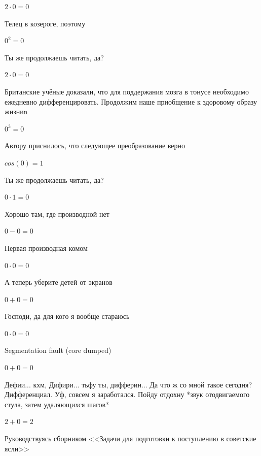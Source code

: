 \documentclass[12pt,a4paper,fleqn]{article}
\begin{document}
\begin{center}$2 \cdot 0 = 0$\end{center}
Телец в козероге, поэтому

\begin{center}$0^{2} = 0$\end{center}
Ты же продолжаешь читать, да?

\begin{center}$2 \cdot 0 = 0$\end{center}
Британские учёные доказали, что для поддержания мозга в тонусе необходимо ежедневно дифференцировать. Продолжим наше приобщение к здоровому образу жизниn

\begin{center}$0^{3} = 0$\end{center}
Автору приснилось, что следующее преобразование верно

\begin{center}$cos(0) = 1$\end{center}
Ты же продолжаешь читать, да?

\begin{center}$0 \cdot 1 = 0$\end{center}
Хорошо там, где производной нет\cite{link2}

\begin{center}$0-0 = 0$\end{center}
Первая производная комом\cite{link2}

\begin{center}$0 \cdot 0 = 0$\end{center}
А теперь уберите детей от экранов

\begin{center}$0+0 = 0$\end{center}
Господи, да для кого я вообще стараюсь

\begin{center}$0 \cdot 0 = 0$\end{center}
Segmentation fault (core dumped)

\begin{center}$0+0 = 0$\end{center}
Дефии... кхм, Дифири... тьфу ты, дифферин... Да что ж со мной такое сегодня? Дифференциал. Уф, совсем я заработался. Пойду отдохну *звук отодвигаемого стула, затем удаляющихся шагов*

\begin{center}$2+0 = 2$\end{center}
Руководствуясь сборником <<Задачи для подготовки к поступлению в советские ясли>>\cite{link1}
\end{document}
